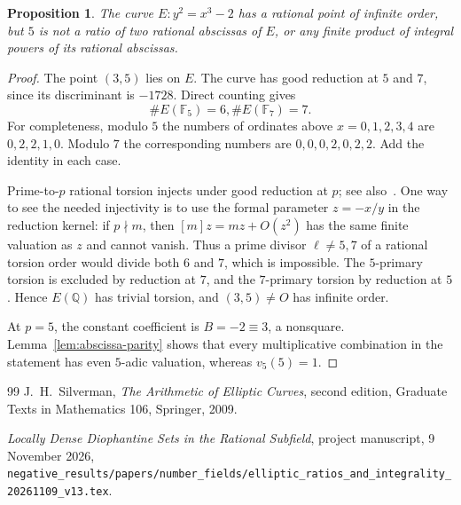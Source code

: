 \documentclass[11pt,a4paper]{article}
\newtheorem{proposition}[theorem]{Proposition}
\theoremstyle{definition}\newtheorem{definition}[theorem]{Definition}
\theoremstyle{remark}\newtheorem{remark}[theorem]{Remark}
\newcommand{\Q}{\mathbb Q}\newcommand{\Z}{\mathbb Z}
\begin{document}
\begin{proposition}\label{prop:abscissa-example}
The curve $E:y^2=x^3-2$ has a rational point of infinite order,
but $5$ is not a ratio of two rational abscissas of $E$, or
any finite product of integral powers of its rational abscissas.
\end{proposition}
\begin{proof}
The point $(3,5)$ lies on $E$. The curve has good reduction at
$5$ and $7$, since its discriminant is $-1728$. Direct counting
gives
\[
                       \#E(\mathbb F_5)=6,
                       \#E(\mathbb F_7)=7.
\]
For completeness, modulo $5$ the numbers of ordinates above
$x=0,1,2,3,4$ are $0,2,2,1,0$. Modulo $7$ the corresponding
numbers are $0,0,0,2,0,2,2$. Add the identity in each case.

Prime-to-$p$ rational torsion injects under good reduction at
$p$; see also~\cite[Chapter VII, Section 3]{Silverman}. One way to see the needed injectivity is to use the formal
parameter $z=-x/y$ in the reduction kernel: if $p\nmid m$,
then $[m]z=mz+O(z^2)$ has the same finite valuation as $z$ and
cannot vanish. Thus a prime divisor $\ell\ne5,7$ of a rational
torsion order would divide both $6$ and $7$, which is impossible.
The $5$-primary torsion is excluded by reduction at $7$, and
the $7$-primary torsion by reduction at $5$. Hence $E(\Q)$
has trivial torsion, and $(3,5)\ne O$ has infinite order.

At $p=5$, the constant coefficient is $B=-2\equiv3$, a
nonsquare. Lemma~\ref{lem:abscissa-parity} shows that every
multiplicative combination in the statement has even
$5$-adic valuation, whereas $v_5(5)=1$.
\end{proof}

\begin{thebibliography}{99}
J.~H.~Silverman, \emph{The Arithmetic of Elliptic Curves},
second edition, Graduate Texts in Mathematics 106,
Springer, 2009.

\emph{Locally Dense Diophantine Sets in the Rational Subfield},
project manuscript, 9 November 2026,
\nolinkurl{negative_results/papers/number_fields/elliptic_ratios_and_integrality_20261109_v13.tex}.
\end{thebibliography}
\end{document}
